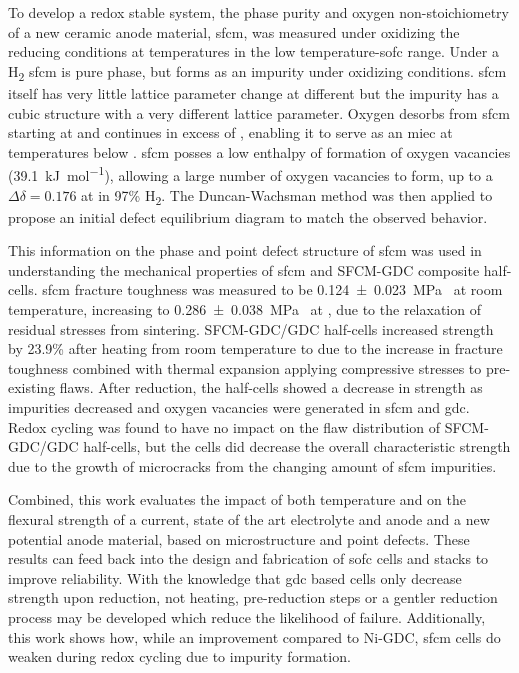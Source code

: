 To develop a redox stable system, the phase purity and oxygen non-stoichiometry of a new ceramic anode material, \gls{sfcm}, was measured under oxidizing the reducing conditions at temperatures in the low temperature-\gls{sofc} range.
Under a H\textsubscript{2} \gls{sfcm} is pure phase, but forms  as an impurity under oxidizing conditions.
\Gls{sfcm} itself has very little lattice parameter change at different  but the impurity  has a cubic structure with a very different lattice parameter.
Oxygen desorbs from \Gls{sfcm} starting at  and continues in excess of , enabling it to serve as an \gls{miec} at temperatures below .
\Gls{sfcm} posses a low enthalpy of formation of oxygen vacancies (\SI{39.1}{\kilo\joule\per\mol}), allowing a large number of oxygen vacancies to form, up to a $\Delta\delta = 0.176$ at  in 97\% H\textsubscript{2}.
The Duncan-Wachsman method was then applied to propose an initial defect equilibrium diagram to match the observed behavior.

This information on the phase and point defect structure of \gls{sfcm} was used in understanding the mechanical properties of \gls{sfcm} and SFCM-GDC composite half-cells.
\Gls{sfcm} fracture toughness was measured to be \SI[separate-uncertainty = true]{0.124 +- 0.023}{\mega\pascal{}} at room temperature, increasing to \SI[separate-uncertainty = true]{0.286 +- 0.038}{\mega\pascal{}} at , due to the relaxation of residual stresses from sintering.
SFCM-GDC/GDC half-cells increased strength by 23.9\% after heating from room temperature to  due to the increase in fracture toughness combined with thermal expansion applying compressive stresses to pre-existing flaws.
After reduction, the half-cells showed a decrease in strength as impurities decreased and oxygen vacancies were generated in \gls{sfcm} and \gls{gdc}.
Redox cycling was found to have no impact on the flaw distribution of SFCM-GDC/GDC half-cells, but the cells did decrease the overall characteristic strength due to the growth of microcracks from the changing amount of \gls{sfcm} impurities.

Combined, this work evaluates the impact of both temperature and  on the flexural strength of a current, state of the art electrolyte and anode and a new potential anode material, based on microstructure and point defects.
These results can feed back into the design and fabrication of \gls{sofc} cells and stacks to improve reliability.
With the knowledge that \gls{gdc} based cells only decrease strength upon reduction, not heating, pre-reduction steps or a gentler reduction process may be developed which reduce the likelihood of failure.
Additionally, this work shows how, while an improvement compared to Ni-GDC, \gls{sfcm} cells do weaken during redox cycling due to impurity formation.


